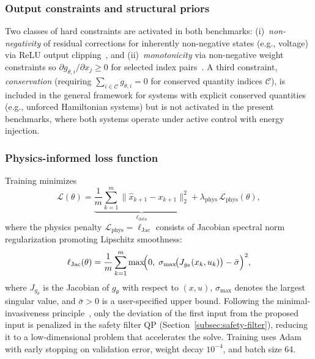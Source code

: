 \documentclass[12pt,a4paper]{article}
\begin{document}
\subsubsection{Output constraints and structural priors}
\label{subsubsec:constraints}

Two classes of hard constraints are activated in both benchmarks:
(i)~\textit{non-negativity} of residual corrections for inherently
non-negative states (e.g., voltage) via ReLU output
clipping~\cite{liu2022monotone}, and (ii)~\textit{monotonicity}
via non-negative weight constraints so
$\partial g_{\theta,i}/\partial x_j \geq 0$ for selected index
pairs~\cite{liu2022monotone}. A third constraint,
\textit{conservation} (requiring
$\sum_{i \in \mathcal{C}} g_{\theta,i} = 0$ for conserved quantity
indices $\mathcal{C}$), is included in the general framework for
systems with explicit conserved quantities (e.g., unforced Hamiltonian
systems) but is not activated in the present benchmarks, where both
systems operate under active control with energy injection.

\subsubsection{Physics-informed loss function}
\label{subsubsec:loss}

Training minimizes
\begin{equation}
  \mathcal{L}(\theta) = \underbrace{\frac{1}{m}\sum_{k=1}^m
  \bigl\|\hat{x}_{k+1} - x_{k+1}\bigr\|_2^2}_{\ell_{\mathrm{data}}}
  + \lambda_{\mathrm{phys}}\,\mathcal{L}_{\mathrm{phys}}(\theta),
  \label{eq:loss}
\end{equation}
where the physics penalty
$\mathcal{L}_{\mathrm{phys}} = \ell_{\mathrm{Jac}}$ consists of
Jacobian spectral norm regularization promoting Lipschitz smoothness:
\begin{equation}
  \ell_{\mathrm{Jac}}(\theta) = \frac{1}{m}\sum_{k=1}^m
  \max\!\Bigl(0,\;
  \sigma_{\max}\!\bigl(J_{g_\theta}(x_k,u_k)\bigr) - \bar\sigma
  \Bigr)^2,
  \label{eq:jac-penalty}
\end{equation}
where $J_{g_\theta}$ is the Jacobian of $g_\theta$ with respect to
$(x,u)$, $\sigma_{\max}$ denotes the largest singular value, and
$\bar\sigma > 0$ is a user-specified upper bound. Following the
minimal-invasiveness principle~\cite{wabersich2021psf}, only the
deviation of the first input from the proposed input is penalized in
the safety filter QP (Section~\ref{subsec:safety-filter}), reducing
it to a low-dimensional problem that accelerates the solve. Training
uses Adam with early stopping on validation error, weight decay
$10^{-4}$, and batch size 64.
\end{document}
